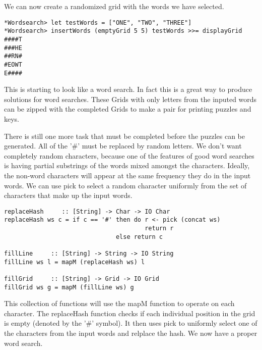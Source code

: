 \documentclass[12pt]{report}   %
\begin{document}
    \vspace{12pt}

    We can now create a randomized grid with the words we have selected.

    \vspace{12pt}

    \begin{lstlisting}
*Wordsearch> let testWords = ["ONE", "TWO", "THREE"]
*Wordsearch> insertWords (emptyGrid 5 5) testWords >>= displayGrid
####T
###HE
##RN#
#EOWT
E####
    \end{lstlisting}

    \vspace{12pt}

    This is starting to look like a word search. In fact this is a great way
    to produce solutions for word searches. These Grids with only letters from
    the inputed words can be zipped with the completed Grids to make a pair
    for printing puzzles and keys.

    \vspace{12pt}

    There is still one more task that must be completed before the puzzles can
    be generated. All of the '\#' must be replaced by random letters. We don't
    want completely random characters, because one of the features of good 
    word searches is having partial substrings of the words mixed amongst the
    characters. Ideally, the non-word characters will appear at the same
    frequency they do in the input words. We can use pick to select a random
    character uniformly from the set of characters that make up the input
    words.

    \vspace{12pt}

    \begin{lstlisting}
replaceHash     :: [String] -> Char -> IO Char
replaceHash ws c = if c == '#' then do r <- pick (concat ws)
                                       return r
                               else return c

fillLine     :: [String] -> String -> IO String
fillLine ws l = mapM (replaceHash ws) l

fillGrid     :: [String] -> Grid -> IO Grid
fillGrid ws g = mapM (fillLine ws) g
    \end{lstlisting}

    \vspace{12pt}

    This collection of functions will use the mapM function to operate on each
    character. The replaceHash function checks if each individual position in
    the grid is empty (denoted by the '\#' symbol). It then uses pick to 
    uniformly select one of the characters from the input words and relplace
    the hash. We now have a proper word search.
\end{document}

